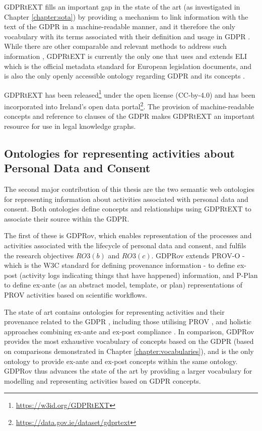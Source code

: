 GDPRtEXT fills an important gap in the state of the art (as investigated in Chapter \ref{chapter:sota}) by providing a mechanism to link information with the text of the GDPR in a machine-readable manner, and it therefore the only vocabulary with its terms associated with their definition and usage in GDPR .
While there are other comparable and relevant methods to address such information \cite{agarwal_legislative_2018,palmirani_pronto:_2018-1}, GDPRtEXT is currently the only one  that uses and extends ELI \cite{noauthor_council_2012} which is the official metadata standard for European legislation documents, and is also the only openly accessible ontology regarding GDPR and its concepts \cite{leone_taking_2019}.

GDPRtEXT has been released\footnote{\url{https://w3id.org/GDPRtEXT}} under the open license (CC-by-4.0) and has been incorporated into Ireland's open data portal\footnote{\url{https://data.gov.ie/dataset/gdprtext}}.
The provision of machine-readable concepts and reference to clauses of the GDPR makes GDPRtEXT an important resource for use in legal knowledge graphs.

\subsection{Ontologies for representing activities about Personal Data and Consent}\label{sec:contributions:ontologies}
The second major contribution of this thesis are the two semantic web ontologies for representing information about activities associated with personal data and consent. Both ontologies define concepts and relationships using GDPRtEXT to associate their source within the GDPR.

The first of these is GDPRov, which enables representation of the processes and activities associated with the lifecycle of personal data and consent, and  fulfils the research objectives $RO3(b)$ and $RO3(c)$.
GDPRov extends PROV-O \cite{lebo_prov-o:_2013} - which is the W3C standard for defining provenance information - to define ex-post (activity logs indicating things that have happened) information, and P-Plan \cite{garijo_p-plan_2014} to define ex-ante (as an abstract model, template, or plan) representations of PROV activities based on scientific workflows.

The state of art contains ontologies for representing activities and their provenance related to the GDPR \cite{pasquier_data_2018,palmirani_pronto:_2018-1}, including those utilising PROV \cite{belhajjame_provenance_2018,bonatti_special_2018-1}, and holistic approaches combining ex-ante and ex-post compliance \cite{dullaert_d3.4_2019}.
In comparison, GDPRov provides the most exhaustive vocabulary of concepts based on the GDPR (based on comparisons demonstrated in Chapter \ref{chapter:vocabularies}), and is the only ontology to provide ex-ante and ex-post concepts within the same ontology.
GDPRov thus advances the state of the art by providing a larger vocabulary for modelling and representing activities based on GDPR concepts.


